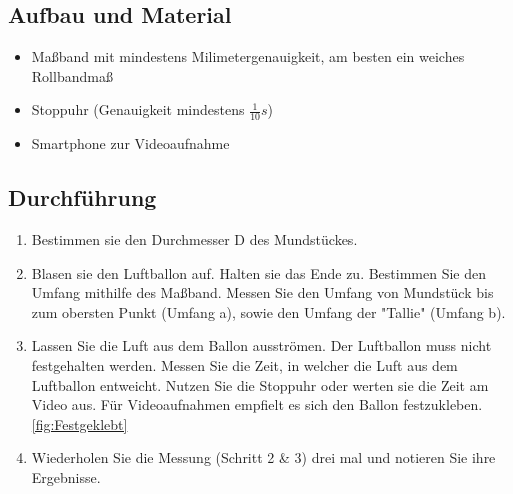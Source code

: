 \documentclass{article}
\begin{document}
    \subsection{Aufbau und Material}
    \begin{itemize}
        \item Maßband mit mindestens Milimetergenauigkeit, am besten ein weiches Rollbandmaß
        \item Stoppuhr (Genauigkeit mindestens \( \frac{1}{10}s \))
        \item Smartphone zur Videoaufnahme
    \end{itemize}

    \subsection{Durchführung}
    \begin{enumerate}
        \item Bestimmen sie den Durchmesser D des Mundstückes.
        \item Blasen sie den Luftballon auf. Halten sie das Ende zu. Bestimmen Sie den Umfang mithilfe des Maßband.
        Messen Sie den Umfang von Mundstück bis zum obersten Punkt (Umfang a), sowie den Umfang der "Tallie" (Umfang b).
        \item Lassen Sie die Luft aus dem Ballon ausströmen. Der Luftballon muss nicht festgehalten werden.
        Messen Sie die Zeit, in welcher die Luft aus dem Luftballon entweicht.
        Nutzen Sie die Stoppuhr oder werten sie die Zeit am Video aus. Für Videoaufnahmen empfielt es sich den Ballon festzukleben.\ref{fig:Festgeklebt}
        \item Wiederholen Sie die Messung (Schritt 2 \& 3) drei mal und notieren Sie ihre Ergebnisse.
    \end{enumerate}
\end{document}
